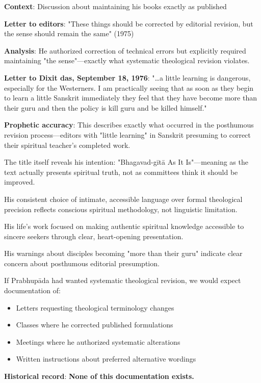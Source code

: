 \documentclass[12pt,twoside]{book}
\begin{document}
\textbf{\textbf{Context}}: Discussion about maintaining his books exactly as published

\textbf{\textbf{Letter to editors}}: "These things should be corrected by editorial revision, but the sense should remain the same" (1975)

\textbf{\textbf{Analysis}}: He authorized correction of technical errors but explicitly required maintaining "the sense"—exactly what systematic theological revision violates.

\textbf{\textbf{Letter to Dixit das, September 18, 1976}}: "\ldots{}a little learning is dangerous, especially for the Westerners. I am practically seeing that as soon as they begin to learn a little Sanskrit immediately they feel that they have become more than their guru and then the policy is kill guru and be killed himself."

\textbf{\textbf{Prophetic accuracy}}: This describes exactly what occurred in the posthumous revision process—editors with "little learning" in Sanskrit presuming to correct their spiritual teacher's completed work.


The title itself reveals his intention: "Bhagavad-gītā As It Is"—meaning as the text actually presents spiritual truth, not as committees think it should be improved.

His consistent choice of intimate, accessible language over formal theological precision reflects conscious spiritual methodology, not linguistic limitation.

His life's work focused on making authentic spiritual knowledge accessible to sincere seekers through clear, heart-opening presentation.

His warnings about disciples becoming "more than their guru" indicate clear concern about posthumous editorial presumption.


If Prabhupāda had wanted systematic theological revision, we would expect documentation of:

\begin{itemize}
\item Letters requesting theological terminology changes
\item Classes where he corrected published formulations
\item Meetings where he authorized systematic alterations
\item Written instructions about preferred alternative wordings
\end{itemize}

\textbf{\textbf{Historical record}}: \textbf{\textbf{None of this documentation exists.}}
\end{document}
